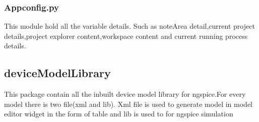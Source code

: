 \documentclass[12pt]{article}
\begin{document}
\subsubsection{Appconfig.py}
This module hold all the variable details. Such as noteArea detail,current project details,project explorer content,workspace content and current running process details.

\subsection{deviceModelLibrary}
This package contain all the inbuilt device model library for ngspice.For every model there is two file(xml and lib). Xml file is used to generate model in model editor widget in the form of table and lib is used to for ngspice simulation
\end{document}
